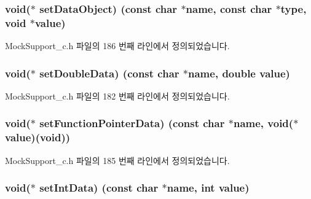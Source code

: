 \subsubsection[{\texorpdfstring{set\+Data\+Object}{setDataObject}}]{\setlength{\rightskip}{0pt plus 5cm}void($\ast$ set\+Data\+Object) (const char $\ast$name, const char $\ast$type, void $\ast$value)}\hypertarget{struct_s_mock_support__c_ad95e8b1c279dac95298d7f03e735ac8d}{}\label{struct_s_mock_support__c_ad95e8b1c279dac95298d7f03e735ac8d}


Mock\+Support\+\_\+c.\+h 파일의 186 번째 라인에서 정의되었습니다.

\subsubsection[{\texorpdfstring{set\+Double\+Data}{setDoubleData}}]{\setlength{\rightskip}{0pt plus 5cm}void($\ast$ set\+Double\+Data) (const char $\ast$name, double value)}\hypertarget{struct_s_mock_support__c_a1b426638010163acc67bd1c82779c889}{}\label{struct_s_mock_support__c_a1b426638010163acc67bd1c82779c889}


Mock\+Support\+\_\+c.\+h 파일의 182 번째 라인에서 정의되었습니다.

\subsubsection[{\texorpdfstring{set\+Function\+Pointer\+Data}{setFunctionPointerData}}]{\setlength{\rightskip}{0pt plus 5cm}void($\ast$ set\+Function\+Pointer\+Data) (const char $\ast$name, void($\ast$value)(void))}\hypertarget{struct_s_mock_support__c_aa922bfffb113725fbc6660dc18a88f4a}{}\label{struct_s_mock_support__c_aa922bfffb113725fbc6660dc18a88f4a}


Mock\+Support\+\_\+c.\+h 파일의 185 번째 라인에서 정의되었습니다.

\subsubsection[{\texorpdfstring{set\+Int\+Data}{setIntData}}]{\setlength{\rightskip}{0pt plus 5cm}void($\ast$ set\+Int\+Data) (const char $\ast$name, int value)}\hypertarget{struct_s_mock_support__c_a476aa5f3d7b30361733ff18d68860814}{}\label{struct_s_mock_support__c_a476aa5f3d7b30361733ff18d68860814}


